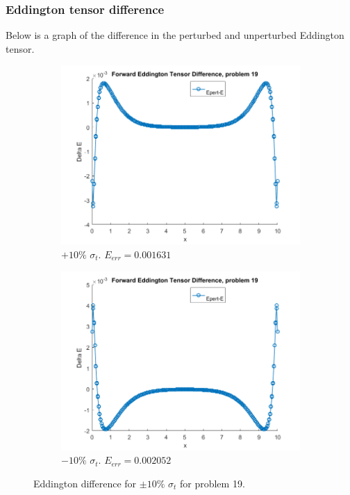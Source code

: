 \documentclass{article}
\begin{document}
\subsubsection{Eddington tensor difference}
Below is a graph of the difference in the perturbed and unperturbed Eddington tensor.
\begin{figure}[H]
\centering
\begin{subfigure}{.5\textwidth}
  \centering
  \includegraphics[width=1\linewidth]{p19deltaE.png}
  \caption{$+10\%$ $\sigma_t$. $E_{err}=0.001631$}
  \label{fig:sub1}
\end{subfigure}%
\begin{subfigure}{.5\textwidth}
  \centering
  \includegraphics[width=1\linewidth]{p19deltaEdst-10.png}
  \caption{$-10\%$ $\sigma_t$. $E_{err}=0.002052$}
  \label{fig:sub2}
\end{subfigure}
\caption{Eddington difference for $\pm10\%$ $\sigma_t$ for problem 19.}
\label{fig:test}
\end{figure}
\end{document}
